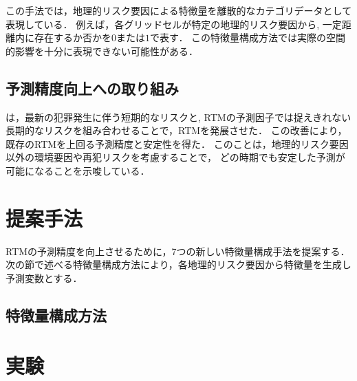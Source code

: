 \documentclass[12pt,a4paper,oneside]{jsbook}
\theoremstyle{plain}
\begin{document}


この手法では，地理的リスク要因による特徴量を離散的なカテゴリデータとして表現している．
例えば，各グリッドセルが特定の地理的リスク要因から,
一定距離内に存在するか否かを$0$または$1$で表す．
この特徴量構成方法では実際の空間的影響を十分に表現できない可能性がある．
\section{予測精度向上への取り組み}
\citet{大山智也2020短期的}は，最新の犯罪発生に伴う短期的なリスクと,
RTMの予測因子では捉えきれない長期的なリスクを組み合わせることで，RTMを発展させた．
この改善により，既存のRTMを上回る予測精度と安定性を得た．
このことは，地理的リスク要因以外の環境要因や再犯リスクを考慮することで，
どの時期でも安定した予測が可能になることを示唆している．
\chapter{提案手法}
\label{chapter_3}

RTMの予測精度を向上させるために，7つの新しい特徴量構成手法を提案する．
次の節で述べる特徴量構成方法により，各地理的リスク要因から特徴量を生成し予測変数とする．

\section{特徴量構成方法}

\chapter{実験}
\label{chapter_4}
\end{document}
